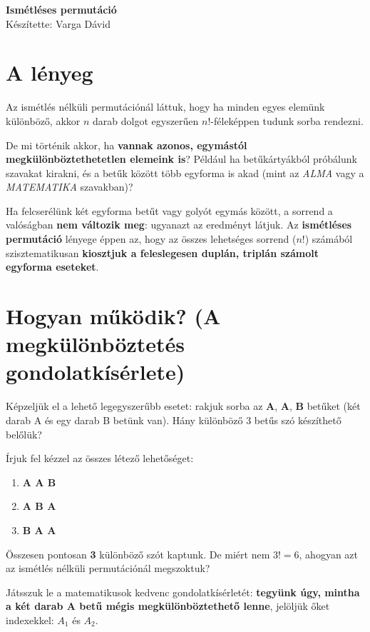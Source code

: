 \documentclass[11pt, a4paper]{article}
\begin{document}
\begin{center}
    \LARGE \textbf{Ismétléses permutáció} \\
    \vspace{0.3cm}
    \large Készítette: Varga Dávid \\
    \vspace{0.5cm}
\end{center}

\vspace{0.3cm}

\section{A lényeg}
Az ismétlés nélküli permutációnál láttuk, hogy ha minden egyes elemünk különböző, akkor $n$ darab dolgot egyszerűen $n!$-féleképpen tudunk sorba rendezni.

De mi történik akkor, ha \textbf{vannak azonos, egymástól megkülönböztethetetlen elemeink is}? Például ha betűkártyákból próbálunk szavakat kirakni, és a betűk között több egyforma is akad (mint az \textit{ALMA} vagy a \textit{MATEMATIKA} szavakban)?

Ha felcserélünk két egyforma betűt vagy golyót egymás között, a sorrend a valóságban \textbf{nem változik meg}: ugyanazt az eredményt látjuk. Az \textbf{ismétléses permutáció} lényege éppen az, hogy az összes lehetséges sorrend ($n!$) számából szisztematikusan \textbf{kiosztjuk a feleslegesen duplán, triplán számolt egyforma eseteket}.

\section{Hogyan működik? (A megkülönböztetés gondolatkísérlete)}
Képzeljük el a lehető legegyszerűbb esetet: rakjuk sorba az \textbf{A}, \textbf{A}, \textbf{B} betűket (két darab A és egy darab B betünk van). Hány különböző 3 betűs szó készíthető belőlük? 

Írjuk fel kézzel az összes létező lehetőséget:
\begin{enumerate}
    \item \textbf{A A B}
    \item \textbf{A B A}
    \item \textbf{B A A}
\end{enumerate}
Összesen pontosan \textbf{3} különböző szót kaptunk. De miért nem $3! = 6$, ahogyan azt az ismétlés nélküli permutációnál megszoktuk?

Játsszuk le a matematikusok kedvenc gondolatkísérletét: \textbf{tegyünk úgy, mintha a két darab A betű mégis megkülönböztethető lenne}, jelöljük őket indexekkel: $A_1$ és $A_2$.
\end{document}
